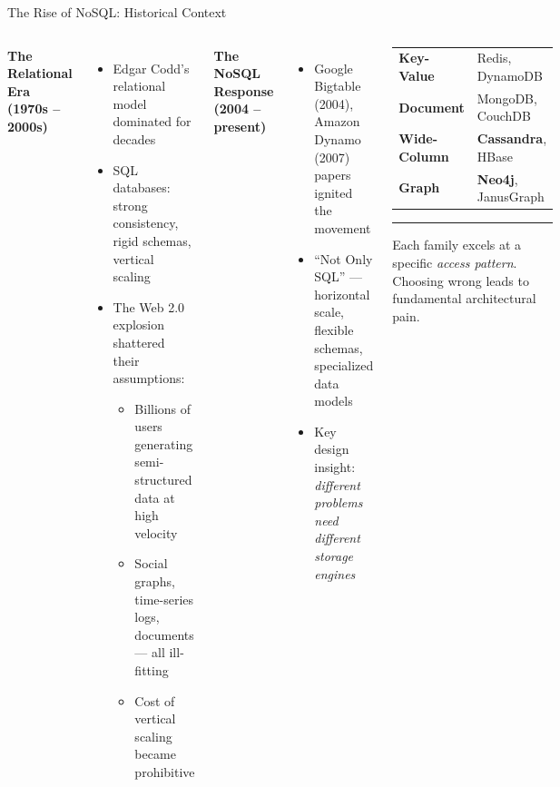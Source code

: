 \documentclass[aspectratio=169]{beamer}
\begin{document}
\begin{frame}{The Rise of NoSQL: Historical Context}
  \begin{columns}[T]
      \textbf{The Relational Era (1970s -- 2000s)}
      \begin{itemize}\small
        \item Edgar Codd's relational model dominated for decades
        \item SQL databases: strong consistency, rigid schemas, vertical scaling
        \item The Web 2.0 explosion shattered their assumptions:
        \begin{itemize}\scriptsize
          \item Billions of users generating semi-structured data at high velocity
          \item Social graphs, time-series logs, documents — all ill-fitting
          \item Cost of vertical scaling became prohibitive
        \end{itemize}
      \end{itemize}
      \vspace{0.3cm}
      \textbf{The NoSQL Response (2004 -- present)}
      \begin{itemize}\small
        \item Google Bigtable (2004), Amazon Dynamo (2007) papers ignited the movement
        \item ``Not Only SQL'' — horizontal scale, flexible schemas, specialized data models
        \item Key design insight: \textit{different problems need different storage engines}
      \end{itemize}
      \begin{tcolorbox}[infobox, title=Four NoSQL Families]
        \scriptsize
        \begin{tabular}{@{}ll@{}}
          \textbf{Key-Value} & Redis, DynamoDB \\[2pt]
          \textbf{Document} & MongoDB, CouchDB \\[2pt]
          \textbf{Wide-Column} & \textcolor{cassBlue}{\textbf{Cassandra}}, HBase \\[2pt]
          \textbf{Graph} & \textcolor{neo4jGreen}{\textbf{Neo4j}}, JanusGraph \\
        \end{tabular}
        \vspace{0.2cm}
        \hrule
        \vspace{0.2cm}
        Each family excels at a specific \textit{access pattern}. Choosing wrong leads to fundamental architectural pain.
      \end{tcolorbox}
    \end{columns}
\end{frame}
\end{document}

